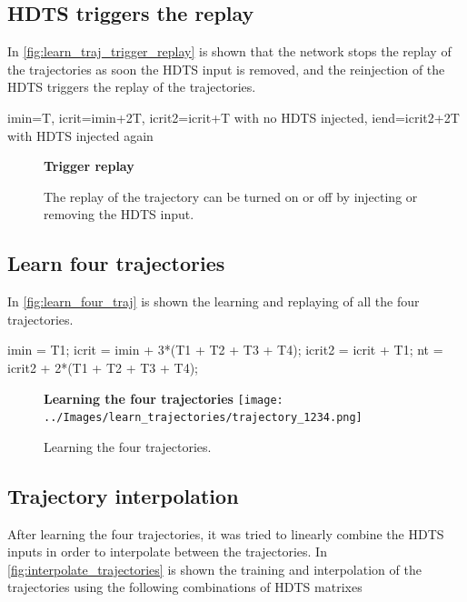 \documentclass[10pt,a4paper, final]{report} %
\begin{document}
\subsection{HDTS triggers the replay}
In \autoref{fig:learn_traj_trigger_replay} is shown that the network stops the replay of the trajectories as soon the HDTS input is removed, and the reinjection of the HDTS triggers the replay of the trajectories.

imin=T, icrit=imin+2T, icrit2=icrit+T with no HDTS injected, iend=icrit2+2T with HDTS injected again

\begin{figure}[H]
\centering
\textbf{Trigger replay}
\\
\caption{The replay of the trajectory can be turned on or off by injecting or removing the HDTS input.}
\label{fig:learn_traj_trigger_replay}
\end{figure}

\subsection{Learn four trajectories}
In \autoref{fig:learn_four_traj} is shown the learning and replaying of all the four trajectories.

 imin = T1;
icrit = imin + 3*(T1 + T2 + T3 + T4);
icrit2 = icrit + T1;
nt = icrit2 + 2*(T1 + T2 + T3 + T4);

\begin{figure}[H]
\centering
\textbf{Learning the four trajectories}
\texttt{[image: ../Images/learn\_trajectories/trajectory\_1234.png]} 
\caption{Learning the four trajectories.}
\label{fig:learn_four_traj}
\end{figure}

\subsection{Trajectory interpolation}
After learning the four trajectories, it was tried to linearly combine the HDTS inputs in order to interpolate between the trajectories. In \autoref{fig:interpolate_trajectories} is shown the training and interpolation of the trajectories using the following combinations of HDTS matrixes
\end{document}
